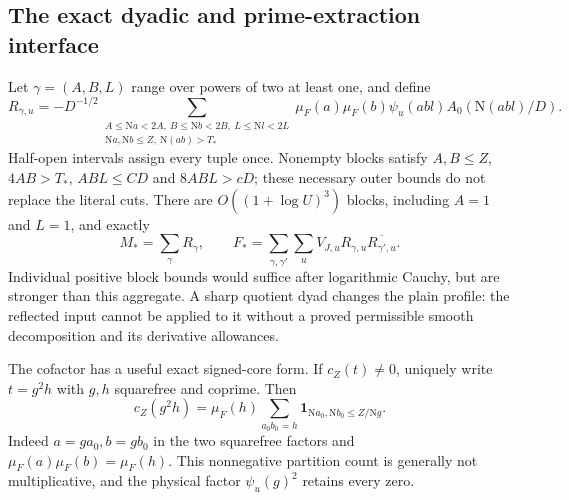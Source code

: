 \documentclass[11pt]{article}
\theoremstyle{definition}
\newcommand{\N}{\mathrm N}
\newcommand{\Id}{\mathbf 1}
\begin{document}
\subsection{The exact dyadic and prime-extraction interface}
\label{bil-dyadic-interface}
Let $\gamma=(A,B,L)$ range over powers of two at least one, and define
\begin{equation}\label{bil-dyadic-block}
 R_{\gamma,u}=-D^{-1/2}
 \sum_{\substack{A\le\N a<2A,\ B\le\N b<2B,\ L\le\N l<2L\\
                  \N a,\N b\le Z,\ \N(ab)>T_*}}
 \mu_F(a)\mu_F(b)\psi_u(abl)A_0(\N(abl)/D).
\end{equation}
Half-open intervals assign every tuple once. Nonempty blocks satisfy
$A,B\le Z$, $4AB>T_*$, $ABL\le CD$ and $8ABL>cD$; these necessary
outer bounds do not replace the literal cuts. There are
$O((1+\log U)^3)$ blocks, including $A=1$ and $L=1$, and exactly
\begin{equation}\label{bil-dyadic-pair-form}
 M_* =\sum_\gamma R_\gamma,\qquad
 F_* =\sum_{\gamma,\gamma'}\sum_uV_{J,u}
                     R_{\gamma,u}\overline{R_{\gamma',u}}.
\end{equation}
Individual positive block bounds would suffice after logarithmic Cauchy,
but are stronger than this aggregate. A sharp quotient dyad changes the
plain profile: the reflected input cannot be applied to it without a
proved permissible smooth decomposition and its derivative allowances.

The cofactor has a useful exact signed-core form. If $c_Z(t)\ne0$,
uniquely write $t=g^2h$ with $g,h$ squarefree and coprime. Then
\begin{equation}\label{bil-squarefree-core}
 c_Z(g^2h)=\mu_F(h)\sum_{a_0b_0=h}
                         \Id_{\N a_0,\N b_0\le Z/\N g}.
\end{equation}
Indeed $a=g a_0,b=g b_0$ in the two squarefree factors and
$\mu_F(a)\mu_F(b)=\mu_F(h)$. This nonnegative partition count is
generally not multiplicative, and the physical factor $\psi_u(g)^2$
retains every zero.
\end{document}
